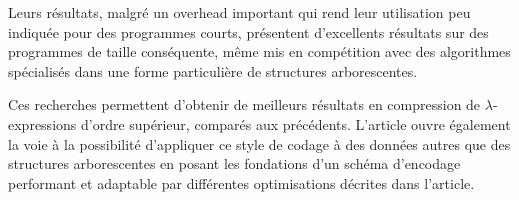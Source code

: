 \documentclass[titlepage]{article}
\begin{document}
Leurs résultats, malgré un overhead important qui rend
leur utilisation peu indiquée pour des programmes courts, présentent d'excellents
résultats sur des programmes de taille conséquente, même mis en compétition avec
des algorithmes spécialisés dans une forme particulière de structures arborescentes.

Ces recherches permettent d'obtenir de meilleurs résultats en compression de
\(\lambda\)-expressions d'ordre supérieur, comparés aux précédents. L'article ouvre
également la voie à la possibilité d'appliquer ce style de codage à des données
autres que des structures arborescentes en posant les fondations d'un schéma
d'encodage performant et adaptable par différentes optimisations décrites dans
l'article.


{}
\end{document}
